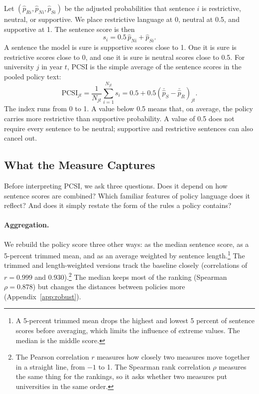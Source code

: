 \documentclass[11pt]{article}
\begin{document}
Let $(\hat p_{Ri}, \hat p_{Ni}, \hat p_{Si})$ be the adjusted probabilities that sentence $i$ is restrictive, neutral, or supportive. We place restrictive language at 0, neutral at 0.5, and supportive at 1. The sentence score is then
\begin{equation}
s_i = 0.5\,\hat p_{Ni} + \hat p_{Si}.
\end{equation}
A sentence the model is sure is supportive scores close to 1. One it is sure is restrictive scores close to 0, and one it is sure is neutral scores close to 0.5. For university $j$ in year $t$, PCSI is the simple average of the sentence scores in the pooled policy text:
\begin{equation}
\text{PCSI}_{jt} = \frac{1}{N_{jt}}\sum_{i=1}^{N_{jt}} s_i = 0.5 + 0.5\left(\bar{\hat p}_{S} - \bar{\hat p}_{R}\right)_{jt}.
\end{equation}
The index runs from 0 to 1. A value below 0.5 means that, on average, the policy carries more restrictive than supportive probability. A value of 0.5 does not require every sentence to be neutral; supportive and restrictive sentences can also cancel out.

\subsection{What the Measure Captures}\label{sec:captures}

Before interpreting PCSI, we ask three questions. Does it depend on how sentence scores are combined? Which familiar features of policy language does it reflect? And does it simply restate the form of the rules a policy contains?

\paragraph{Aggregation.} We rebuild the policy score three other ways: as the median sentence score, as a 5-percent trimmed mean, and as an average weighted by sentence length.\footnote{A 5-percent trimmed mean drops the highest and lowest 5 percent of sentence scores before averaging, which limits the influence of extreme values. The median is the middle score.} The trimmed and length-weighted versions track the baseline closely (correlations of $r = 0.999$ and $0.930$).\footnote{The Pearson correlation $r$ measures how closely two measures move together in a straight line, from $-1$ to 1. The Spearman rank correlation $\rho$ measures the same thing for the rankings, so it asks whether two measures put universities in the same order.} The median keeps most of the ranking (Spearman $\rho = 0.878$) but changes the distances between policies more (Appendix~\ref{app:robust}).
\end{document}

